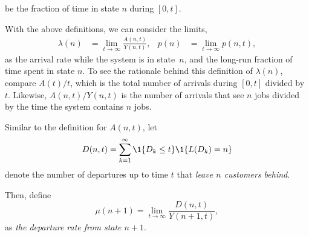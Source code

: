 be the fraction of time in state $n$ during $[0,t]$.





With the above definitions, we can consider the limits,
\begin{align}\label{eq:p(n)}
 \lambda(n) &= \lim_{t\to\infty} \frac{A(n,t)}{Y(n,t)}, &p(n) &=\lim_{t\to\infty} p(n,t),
\end{align}
as the arrival rate while the system is in state~$n$, and the long-run fraction of time spent in state $n$.
To see the rationale behind this definition of $\lambda(n)$, compare $A(t)/t$, which is the total number of arrivals during $[0,t]$ divided by~$t$.
Likewise, $A(n,t)/Y(n,t)$ is the number of arrivals that see $n$ jobs divided by the time the system contains $n$ jobs.



Similar to the definition for $A(n,t)$, let
\begin{equation}\label{eq:102}
 D(n,t) = \sum_{k=1}^\infty \1{D_k \leq t} \1{\L(D_k) = n}
 \end{equation}
 denote the number of departures up to time $t$ that\emph{ leave $n$
 customers behind}.
\begin{marginfigure}%
\end{marginfigure}
Then, define
\begin{equation*}
 \mu(n+1) = \lim_{t\to\infty} \frac{D(n,t)}{Y(n+1,t)},
\end{equation*}
as \emph{ the departure rate from state $n+1$}.

